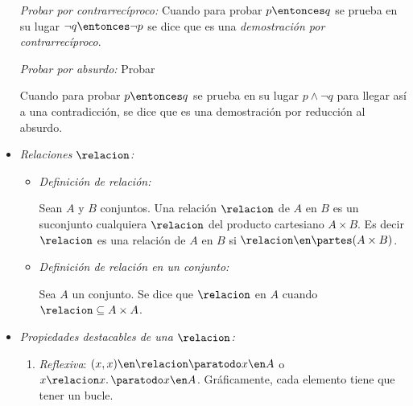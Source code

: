 \begin{itemize}[label={\tiny{}}]
        \hypertarget{teoria-1:contrareciproco}{\textit{Probar por contrarrecíproco:}}
        Cuando para probar $p \entonces q$ se prueba en su lugar $\neg q \entonces \neg p$ se dice que es
        una \textit{demostración
          por contrarrecíproco}.\par

        \hypertarget{teoria-1:absurdo}{\textit{Probar por absurdo:}
        Probar}Cuando para probar $p \entonces q$ se prueba en su lugar $p \land \neg q$ para llegar así
        a una contradicción, se dice que es una demostración por reducción al absurdo.

  \item \hypertarget{teoria-1:relaciones}{\textit{Relaciones $\relacion$:}}\par
        \begin{itemize}[label=\tiny{}]
          \item
                \textit{Definición de relación: }\par
                Sean $A$ y $B$ conjuntos. Una relación $\relacion$ de $A$ en $B$ es un suconjunto
                cualquiera $\relacion$ del producto cartesiano $A \times B$. Es decir $\relacion$ es una relación
                de $A$ en $B$ si $\relacion \en \partes(A \times B)$.
          \item
                \textit{Definición de relación en un conjunto: }\par
                Sea $A$ un conjunto. Se dice que $\relacion$ en $A$ cuando $\relacion \subseteq A \times A$.
        \end{itemize}

  \item \hypertarget{teoria-1:prop-relaciones}{\textit{Propiedades destacables de una $\relacion$:}}\par
        \begin{enumerate}[label=\tiny\faIcon{poop}]
          \item  \textit{Reflexiva}: $(x, x) \en \relacion \paratodo x \en A$ o $x \relacion x.\, \paratodo x \en A$. Gráficamente,
                cada elemento tiene que tener un bucle.


\end{enumerate}
\end{itemize}
